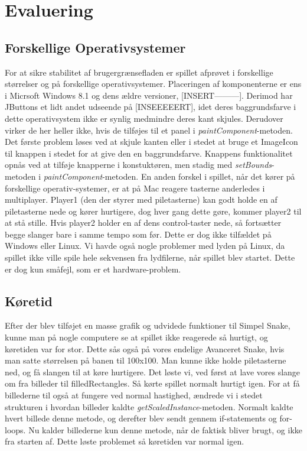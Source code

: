 
\section{Evaluering}

\subsection{Forskellige Operativsystemer}
For at sikre stabilitet af brugergrænsefladen er spillet afprøvet i forskellige størrelser og på forskellige operativsystemer. Placeringen af komponenterne er ens i Micrsoft Windows 8.1 og dens ældre versioner, [INSERT---------]. Derimod har JButtons et lidt andet udseende på [INSEEEEERT], idet deres baggrundsfarve i dette operativsystem ikke er synlig medmindre deres kant skjules. Derudover virker de her heller ikke, hvis de tilføjes til et panel i \textit{paintComponent}-metoden. Det første problem løses ved at skjule kanten eller i stedet at bruge et ImageIcon til knappen i stedet for at give den en baggrundsfarve. Knappens funktionalitet opnås ved at tilføje knapperne i konstuktøren, men stadig med \textit{setBounds}-metoden i \textit{paintComponent}-metoden. 
En anden forskel i spillet, når det kører på forskellige operativ-systemer, er at på Mac reagere tasterne anderledes i multiplayer. Player1 (den der styrer med piletasterne) kan godt holde en af piletasterne nede og kører hurtigere, dog hver gang dette gøre, kommer player2 til at stå stille. Hvis player2 holder en af dens control-taster nede, så fortsætter begge slanger bare i samme tempo som før. Dette er dog ikke tilfældet på Windows eller Linux.
Vi havde også nogle problemer med lyden på Linux, da spillet ikke ville spile hele sekvensen fra lydfilerne, når spillet blev startet.
Dette er dog kun småfejl, som er et hardware-problem.

\subsection{Køretid}
Efter der blev tilføjet en masse grafik og udvidede funktioner til Simpel Snake, kunne man på nogle computere se at spillet ikke reagerede så hurtigt, og køretiden var for stor.
Dette sås også på vores endelige Avanceret Snake, hvis man satte størrelsen på banen til 100x100. Man kunne ikke holde piletasterne ned, og få slangen til at køre hurtigere. Det løste vi, ved først at lave vores slange om fra billeder til filledRectangles. Så kørte spillet normalt hurtigt igen. 
For at få billederne til også at fungere ved normal hastighed, ændrede vi i stedet strukturen i hvordan billeder kaldte \textit{getScaledInstance}-metoden. Normalt kaldte hvert billede denne metode, og derefter blev sendt gennem if-statements og for-loops. Nu kalder billederne kun denne metode, når de faktisk bliver brugt, og ikke fra starten af. Dette løste problemet så køretiden var normal igen.

